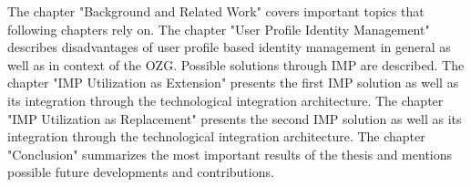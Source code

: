 The chapter "Background and Related Work" covers important topics that following chapters rely on. 
The chapter "User Profile Identity Management" describes disadvantages of user profile based identity management in general as well as in context of the OZG. Possible solutions through IMP are described. 
The chapter "IMP Utilization as Extension" presents the first IMP solution as well as its integration through the technological integration architecture.
The chapter "IMP Utilization as Replacement" presents the second IMP solution as well as its integration through the technological integration architecture.
The chapter "Conclusion" summarizes the most important results of the thesis and mentions possible future developments and contributions.